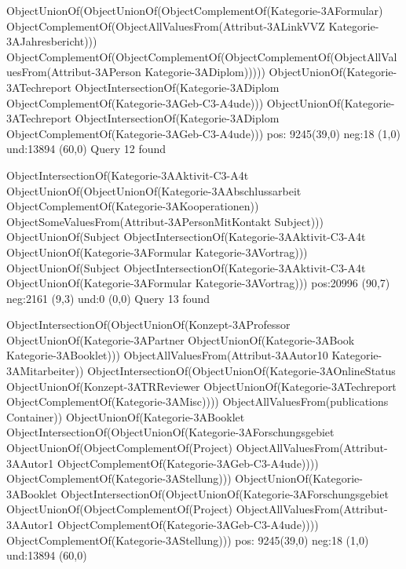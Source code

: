 ObjectUnionOf(ObjectUnionOf(ObjectComplementOf(Kategorie-3AFormular) ObjectComplementOf(ObjectAllValuesFrom(Attribut-3ALinkVVZ Kategorie-3AJahresbericht))) ObjectComplementOf(ObjectComplementOf(ObjectComplementOf(ObjectAllValuesFrom(Attribut-3APerson Kategorie-3ADiplom)))))
ObjectUnionOf(Kategorie-3ATechreport ObjectIntersectionOf(Kategorie-3ADiplom ObjectComplementOf(Kategorie-3AGeb-C3-A4ude)))
ObjectUnionOf(Kategorie-3ATechreport ObjectIntersectionOf(Kategorie-3ADiplom ObjectComplementOf(Kategorie-3AGeb-C3-A4ude)))
pos: 9245(39,0)		 neg:18 (1,0)		 und:13894 (60,0)
Query 12 found

ObjectIntersectionOf(Kategorie-3AAktivit-C3-A4t ObjectUnionOf(ObjectUnionOf(Kategorie-3AAbschlussarbeit ObjectComplementOf(Kategorie-3AKooperationen)) ObjectSomeValuesFrom(Attribut-3APersonMitKontakt Subject)))
ObjectUnionOf(Subject ObjectIntersectionOf(Kategorie-3AAktivit-C3-A4t ObjectUnionOf(Kategorie-3AFormular Kategorie-3AVortrag)))
ObjectUnionOf(Subject ObjectIntersectionOf(Kategorie-3AAktivit-C3-A4t ObjectUnionOf(Kategorie-3AFormular Kategorie-3AVortrag)))
pos:20996 (90,7)		 neg:2161 (9,3)		 und:0 (0,0)
Query 13 found

ObjectIntersectionOf(ObjectUnionOf(Konzept-3AProfessor ObjectUnionOf(Kategorie-3APartner ObjectUnionOf(Kategorie-3ABook Kategorie-3ABooklet))) ObjectAllValuesFrom(Attribut-3AAutor10 Kategorie-3AMitarbeiter))
ObjectIntersectionOf(ObjectUnionOf(Kategorie-3AOnlineStatus ObjectUnionOf(Konzept-3ATRReviewer ObjectUnionOf(Kategorie-3ATechreport ObjectComplementOf(Kategorie-3AMisc)))) ObjectAllValuesFrom(publications Container))
ObjectUnionOf(Kategorie-3ABooklet ObjectIntersectionOf(ObjectUnionOf(Kategorie-3AForschungsgebiet ObjectUnionOf(ObjectComplementOf(Project) ObjectAllValuesFrom(Attribut-3AAutor1 ObjectComplementOf(Kategorie-3AGeb-C3-A4ude)))) ObjectComplementOf(Kategorie-3AStellung)))
ObjectUnionOf(Kategorie-3ABooklet ObjectIntersectionOf(ObjectUnionOf(Kategorie-3AForschungsgebiet ObjectUnionOf(ObjectComplementOf(Project) ObjectAllValuesFrom(Attribut-3AAutor1 ObjectComplementOf(Kategorie-3AGeb-C3-A4ude)))) ObjectComplementOf(Kategorie-3AStellung)))
pos: 9245(39,0)		 neg:18 (1,0)		 und:13894 (60,0)
